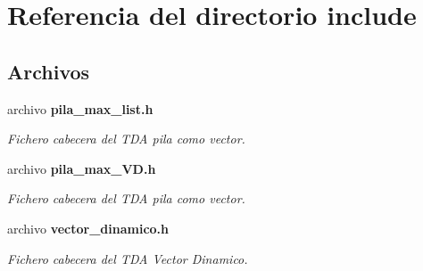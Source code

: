 \section{Referencia del directorio include}
\label{dir_d44c64559bbebec7f509842c48db8b23}
\subsection*{Archivos}
\begin{DoxyCompactItemize}
\item 
archivo {\bf pila\+\_\+max\+\_\+list.\+h}
\begin{DoxyCompactList}\small\item\em Fichero cabecera del T\+DA pila como vector. \end{DoxyCompactList}\item 
archivo {\bf pila\+\_\+max\+\_\+\+V\+D.\+h}
\begin{DoxyCompactList}\small\item\em Fichero cabecera del T\+DA pila como vector. \end{DoxyCompactList}\item 
archivo {\bf vector\+\_\+dinamico.\+h}
\begin{DoxyCompactList}\small\item\em Fichero cabecera del T\+DA Vector Dinamico. \end{DoxyCompactList}\end{DoxyCompactItemize}
